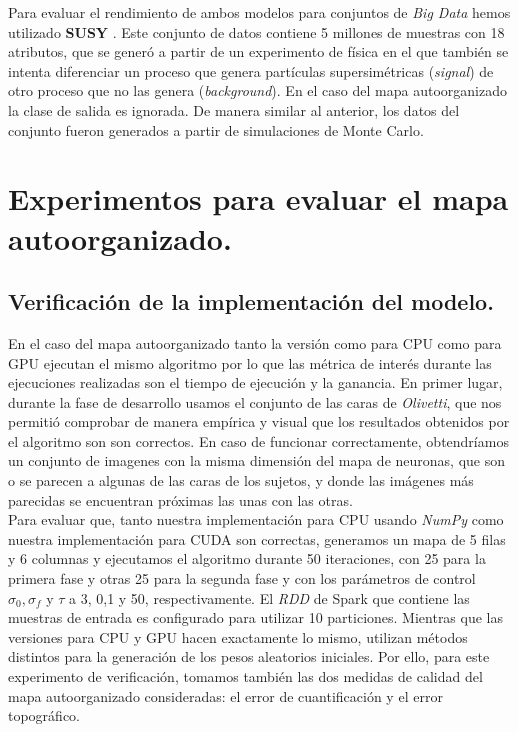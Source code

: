 Para evaluar el rendimiento de ambos modelos para conjuntos de \textit{Big Data} hemos utilizado \textbf{SUSY} \cite{susy}. Este conjunto de datos contiene 5 millones de muestras con 18 atributos, que se generó a partir de un experimento de física en el que también se intenta diferenciar un proceso que genera partículas supersimétricas (\textit{signal}) de otro proceso que no las genera (\textit{background}). En el caso del mapa autoorganizado la clase de salida es ignorada. De manera similar al anterior, los datos del conjunto fueron generados a partir de simulaciones de Monte Carlo.


\section{Experimentos para evaluar el mapa autoorganizado.}
\subsection{Verificación de la implementación del modelo.}
En el caso del mapa autoorganizado tanto la versión como para CPU como para GPU ejecutan el mismo algoritmo por lo que las métrica de interés durante las ejecuciones realizadas son el tiempo de ejecución y la ganancia. En primer lugar, durante la fase de desarrollo usamos el conjunto de las caras de \textit{Olivetti}, que nos permitió comprobar de manera empírica y visual que los resultados obtenidos por el algoritmo son son correctos. En caso de funcionar correctamente, obtendríamos un conjunto de imagenes con la misma dimensión del mapa de neuronas, que son o se parecen a algunas de las caras de los sujetos, y donde las imágenes más parecidas se encuentran próximas las unas con las otras. \\

Para evaluar que, tanto nuestra implementación para CPU usando \textit{NumPy} como nuestra implementación para CUDA son correctas, generamos un mapa de 5 filas y 6 columnas y ejecutamos el algoritmo durante 50 iteraciones, con 25 para la primera fase y otras 25 para la segunda fase y con los parámetros de control $\sigma_0, \sigma_f$ y $\tau$ a 3, 0,1 y 50, respectivamente. El \textit{RDD} de Spark que contiene las muestras de entrada es configurado para utilizar 10 particiones. Mientras que las versiones para CPU y GPU hacen exactamente lo mismo, utilizan métodos distintos para la generación de los pesos aleatorios iniciales. Por ello, para este experimento de verificación, tomamos también las dos medidas de calidad del mapa autoorganizado consideradas: el error de cuantificación y el error topográfico.\\

